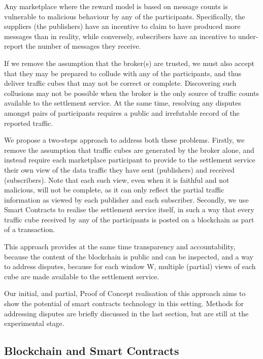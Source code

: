 \documentclass[conference]{IEEEtran}
\begin{document}
Any marketplace where the reward model is based on message counts is vulnerable to malicious behaviour by any of the participants. Specifically, the suppliers (the publishers) have an incentive to claim to have produced more messages than in reality, while conversely, subscribers have an incentive to under-report the number of messages they receive.

If we remove the assumption that the broker(s) are trusted, we must also accept that they may be prepared to collude with any of the participants, and thus deliver traffic cubes that may not be correct or complete.
Discovering such collusions may not be possible when the broker is the only source of traffic counts available to the settlement service.  At the same time, resolving any disputes amongst pairs of participants requires a public and irrefutable record of the reported traffic.

We propose a two-steps approach to address both these problems.
Firstly, we remove the assumption that traffic cubes are generated by the broker alone, and instead require each marketplace participant to provide to the settlement service their own view of the data traffic they have sent (publishers) and received (subscribers).
Note that each such view, even when it is faithful and not malicious, will not be complete, as it can only reflect the partial traffic information as viewed by each publisher and each subscriber.
Secondly, we use Smart Contracts to realise the settlement service itself, in such a way that every traffic cube received by any of the participants is posted on a blockchain as part of a transaction.

This  approach provides at the same time transparency and accountability, because the content of the blockchain is public and can be inspected, and a way to address disputes, because for each window W, multiple (partial) views of each cube are made available to the settlement service.

Our initial, and partial, Proof of Concept realisation of this approach aims to show the potential of smart contracts technology in this setting. Methods for addressing disputes are briefly discussed in the last section, but are still at the experimental stage.


\subsection{Blockchain and Smart Contracts}

\end{document}
